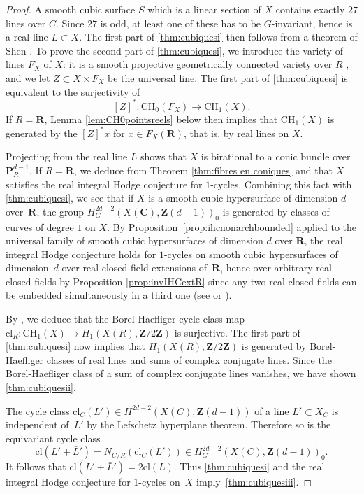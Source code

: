 \documentclass[JEP,XML,SOM,Unicode]{cedram}
\theoremstyle{plain}
\theoremstyle{definition}
\numberwithin{equation}{section}
\newcommand{\cl}{{\mathrm{cl}}}
\renewcommand{\C}{{\mathbf C}}
\renewcommand{\P}{{\mathbf P}}
\newcommand{\R}{{\mathbf R}}
\newcommand{\Z}{{\mathbf Z}}
\newcommand{\CH}{\mathrm{CH}}
\begin{document}
\begin{proof} A smooth cubic surface $S$ which is a linear section of $X$ contains exactly $27$ lines over $C$. Since $27 $ is odd, at least one of these has to be $G$-invariant, hence is a real line $L\subset X$. The first part of \eqref{thm:cubiquesi} then follows from a theorem of Shen \cite[Th.\,1.7]{Shenrationality}.
To prove the second part of \eqref{thm:cubiquesi}, we introduce the variety of lines $F_X$ of $X$: it is a smooth projective geometrically connected variety over $R$ \cite[Cor.\,1.12, Th.\,1.16\,(i)]{AK}, and we let $Z\subset X\times F_X$ be the universal line. The first part of \eqref{thm:cubiquesi} is equivalent to the surjectivity of
\[
[Z]^*:\CH_0(F_X)\to\CH_1(X).
\]
If $R=\R$, Lemma \ref{lem:CH0pointsreels} below then implies that $\CH_1(X)$ is generated by the $[Z]^*x$ for $x\in F_X(\R)$, that is, by real lines on $X$.

Projecting from the real line $L$ shows that $X$ is birational to a conic bundle over~$\P^{d-1}_{R}$. If $R=\R$, we deduce from Theorem \ref{thm:fibres en coniques} and \cite[Prop.\,\ref*{BW1-prop:birinvIHC} \& \ref*{BW1-propIHCprojectivespace}]{BW1} that $X$ satisfies the real integral Hodge conjecture for $1$-cycles.
Combining this fact with \eqref{thm:cubiquesi}, we see that if $X$ is a smooth cubic hypersurface of dimension $d$ over~$\R$, the group $H^{2d-2}_G(X(\C),\Z(d-1))_0$ is generated by classes of curves of degree $1$ on $X$.
By Proposition~\ref{prop:ihcnonarchbounded} applied to the universal family of smooth cubic hypersurfaces of dimension $d$ over $\R$, the real integral Hodge conjecture holds for $1$\nobreakdash-cycles on smooth cubic hypersurfaces of dimension~$d$ over real closed field extensions of~$\R$, hence over arbitrary real closed fields by Proposition \ref{prop:invIHCextR} since any two real closed fields can be embedded simultaneously in a third one (see
\cite[Th.\,28]{conway} or \cite[Prop.\,3.5.11, Ex.\,p.\,197]{ChangKeisler}).

By \cite[Th.\,\ref*{BW1-th:phi} and Prop.\,\ref*{BW1-prop:conoyau norme}]{BW1},
we deduce that the Borel-Haefliger cycle class map $\cl_R:\CH_1(X)\to H_1(X(R),\Z/2\Z)$ is surjective. The first part of \eqref{thm:cubiquesi} now implies that $H_1(X(R),\Z/2\Z)$ is generated by Borel-Haefliger classes of real lines and sums of complex conjugate lines. Since the Borel-Haefliger class of a sum of complex conjugate lines vanishes, we have shown \eqref{thm:cubiquesii}.

The cycle class $\cl_C(L') \in H^{2d-2}(X(C),\Z(d-1))$
of a line $L' \subset X_C$ is independent of~$L'$ by the Lefschetz hyperplane theorem.
Therefore so is the equivariant cycle class
\[
\cl(L'+\bar L')=N_{C/R}(\cl_C(L')) \in H^{2d-2}_G(X(C),\Z(d-1))_0.
\]
It follows that $\cl(L'+\bar L')=2\cl(L)$.
Thus \eqref{thm:cubiquesi} and the real integral Hodge conjecture for $1$\nobreakdash-cycles on~$X$ imply~\eqref{thm:cubiquesiii}.
\end{proof}
\end{document}
